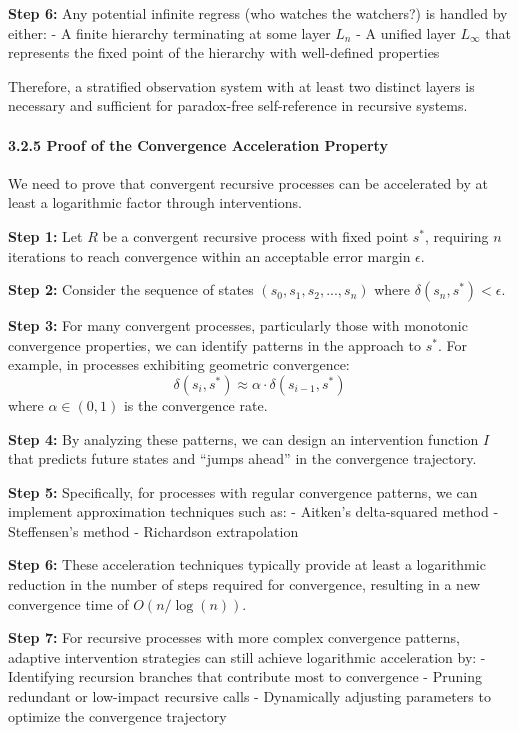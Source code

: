\documentclass[
]{article}
\begin{document}
\textbf{Step 6:} Any potential infinite regress (who watches the
watchers?) is handled by either: - A finite hierarchy terminating at
some layer \(L_n\) - A unified layer \(L_{\infty}\) that represents the
fixed point of the hierarchy with well-defined properties

Therefore, a stratified observation system with at least two distinct
layers is necessary and sufficient for paradox-free self-reference in
recursive systems.

\paragraph{3.2.5 Proof of the Convergence Acceleration
Property}\label{proof-of-the-convergence-acceleration-property}

We need to prove that convergent recursive processes can be accelerated
by at least a logarithmic factor through interventions.

\textbf{Step 1:} Let \(R\) be a convergent recursive process with fixed
point \(s^*\), requiring \(n\) iterations to reach convergence within an
acceptable error margin \(\epsilon\).

\textbf{Step 2:} Consider the sequence of states
\((s_0, s_1, s_2, ..., s_n)\) where \(\delta(s_n, s^*) < \epsilon\).

\textbf{Step 3:} For many convergent processes, particularly those with
monotonic convergence properties, we can identify patterns in the
approach to \(s^*\). For example, in processes exhibiting geometric
convergence:
\[\delta(s_i, s^*) \approx \alpha \cdot \delta(s_{i-1}, s^*)\] where
\(\alpha \in (0,1)\) is the convergence rate.

\textbf{Step 4:} By analyzing these patterns, we can design an
intervention function \(I\) that predicts future states and ``jumps
ahead'' in the convergence trajectory.

\textbf{Step 5:} Specifically, for processes with regular convergence
patterns, we can implement approximation techniques such as: - Aitken's
delta-squared method - Steffensen's method - Richardson extrapolation

\textbf{Step 6:} These acceleration techniques typically provide at
least a logarithmic reduction in the number of steps required for
convergence, resulting in a new convergence time of \(O(n/\log(n))\).

\textbf{Step 7:} For recursive processes with more complex convergence
patterns, adaptive intervention strategies can still achieve logarithmic
acceleration by: - Identifying recursion branches that contribute most
to convergence - Pruning redundant or low-impact recursive calls -
Dynamically adjusting parameters to optimize the convergence trajectory
\end{document}
